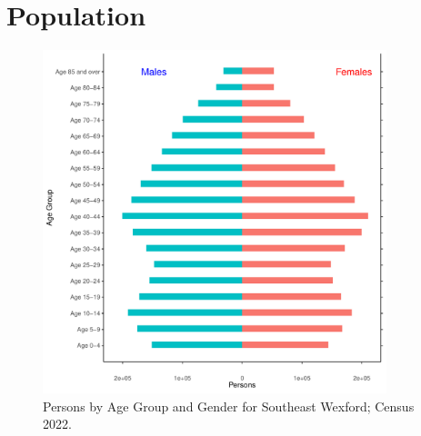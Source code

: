 \documentclass{article}
\begin{document}
\pagebreak

\section{Population} 
\label{sect:Pop}

\begin{figure}[h]
	\centering
	\includegraphics[width = 100mm]{../figures/PyramidPlot.pdf}
	\caption{Persons by Age Group and Gender for Southeast Wexford; Census 2022.}
	\label{fig:2ae19629-1a6a-13a3-e055-000000000001}
	\end{figure}
\end{document}
